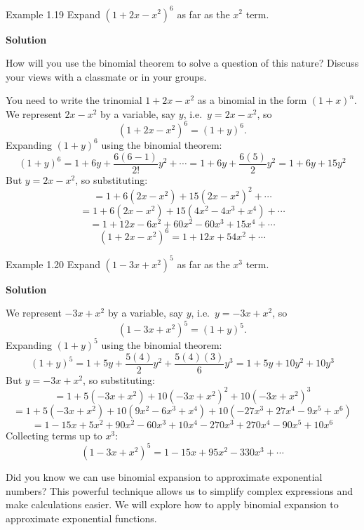\begin{example}{Example 1.19}
Expand $(1+2x-x^2)^6$ as far as the $x^2$ term.

\medskip\noindent\textbf{Solution}

How will you use the binomial theorem to solve a question of this nature?
Discuss your views with a classmate or in your groups.

You need to write the trinomial $1+2x-x^2$ as a binomial in the form $(1+x)^n$.
We represent $2x - x^2$ by a variable, say $y$, i.e.\ $y = 2x - x^2$, so
\[
  (1+2x-x^2)^6 = (1+y)^6.
\]
Expanding $(1+y)^6$ using the binomial theorem:
\[
  (1+y)^6 = 1 + 6y + \frac{6(6-1)}{2!}y^2 + \cdots = 1 + 6y + \frac{6(5)}{2}y^2 = 1 + 6y + 15y^2
\]
But $y = 2x-x^2$, so substituting:
\[
  = 1 + 6(2x-x^2) + 15(2x-x^2)^2 + \cdots
\]
\[
  = 1 + 6(2x-x^2) + 15(4x^2 - 4x^3 + x^4) + \cdots
\]
\[
  = 1 + 12x - 6x^2 + 60x^2 - 60x^3 + 15x^4 + \cdots
\]
\[
  (1+2x-x^2)^6 = 1 + 12x + 54x^2 + \cdots
\]
\end{example}

\begin{example}{Example 1.20}
Expand $(1-3x+x^2)^5$ as far as the $x^3$ term.

\medskip\noindent\textbf{Solution}

We represent $-3x+x^2$ by a variable, say $y$, i.e.\ $y = -3x+x^2$, so
\[
  (1-3x+x^2)^5 = (1+y)^5.
\]
Expanding $(1+y)^5$ using the binomial theorem:
\[
  (1+y)^5 = 1 + 5y + \frac{5(4)}{2}y^2 + \frac{5(4)(3)}{6}y^3 = 1 + 5y + 10y^2 + 10y^3
\]
But $y = -3x+x^2$, so substituting:
\[
  = 1 + 5(-3x+x^2) + 10(-3x+x^2)^2 + 10(-3x+x^2)^3
\]
\[
  = 1 + 5(-3x+x^2) + 10(9x^2 - 6x^3 + x^4) + 10(-27x^3 + 27x^4 - 9x^5 + x^6)
\]
\[
  = 1 - 15x + 5x^2 + 90x^2 - 60x^3 + 10x^4 - 270x^3 + 270x^4 - 90x^5 + 10x^6
\]
Collecting terms up to $x^3$:
\[
  (1-3x+x^2)^5 = 1 - 15x + 95x^2 - 330x^3 + \cdots
\]
\end{example}

Did you know we can use binomial expansion to approximate exponential
numbers? This powerful technique allows us to simplify complex expressions
and make calculations easier. We will explore how to apply binomial expansion
to approximate exponential functions.

